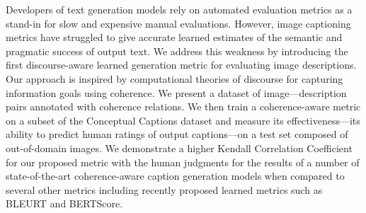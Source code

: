 Developers of text generation models rely on automated evaluation metrics as a stand-in for slow and expensive manual evaluations. However, image captioning metrics have struggled to give accurate learned estimates of the semantic and pragmatic success of output text. We address this weakness by introducing the first discourse-aware learned generation metric for evaluating image descriptions.  Our approach is inspired by computational theories of discourse for capturing information goals using coherence.  We present a dataset of image---description pairs annotated with coherence relations. We then train a coherence-aware metric on a subset of the Conceptual Captions dataset and measure its effectiveness—its ability to predict human ratings of output captions—on a test set composed of out-of-domain images. We demonstrate a higher Kendall Correlation Coefficient for our proposed metric with the human judgments for the results of a number of state-of-the-art coherence-aware caption generation models when compared to several other metrics including recently proposed learned metrics such as BLEURT and BERTScore.
